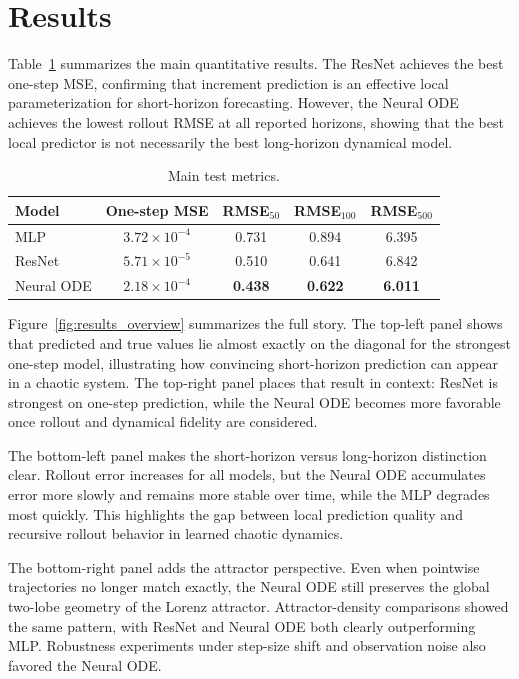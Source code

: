 \documentclass[conference]{IEEEtran}
\begin{document}
\section{Results}
Table~\ref{tab:results} summarizes the main quantitative results. The ResNet achieves the best one-step MSE, confirming that increment prediction is an effective local parameterization for short-horizon forecasting. However, the Neural ODE achieves the lowest rollout RMSE at all reported horizons, showing that the best local predictor is not necessarily the best long-horizon dynamical model.

\begin{table}[t]
\caption{Main test metrics.}
\label{tab:results}
\centering
\footnotesize
\begin{tabular}{lcccc}
\toprule
Model & One-step MSE & RMSE$_{50}$ & RMSE$_{100}$ & RMSE$_{500}$ \\
\midrule
MLP & $3.72{\times}10^{-4}$ & 0.731 & 0.894 & 6.395 \\
ResNet & \textbf{$5.71{\times}10^{-5}$} & 0.510 & 0.641 & 6.842 \\
Neural ODE & $2.18{\times}10^{-4}$ & \textbf{0.438} & \textbf{0.622} & \textbf{6.011} \\
\bottomrule
\end{tabular}
\end{table}

Figure~\ref{fig:results_overview} summarizes the full story. The top-left panel shows that predicted and true values lie almost exactly on the diagonal for the strongest one-step model, illustrating how convincing short-horizon prediction can appear in a chaotic system. The top-right panel places that result in context: ResNet is strongest on one-step prediction, while the Neural ODE becomes more favorable once rollout and dynamical fidelity are considered.

The bottom-left panel makes the short-horizon versus long-horizon distinction clear. Rollout error increases for all models, but the Neural ODE accumulates error more slowly and remains more stable over time, while the MLP degrades most quickly. This highlights the gap between local prediction quality and recursive rollout behavior in learned chaotic dynamics.

The bottom-right panel adds the attractor perspective. Even when pointwise trajectories no longer match exactly, the Neural ODE still preserves the global two-lobe geometry of the Lorenz attractor. Attractor-density comparisons showed the same pattern, with ResNet and Neural ODE both clearly outperforming MLP. Robustness experiments under step-size shift and observation noise also favored the Neural ODE.
\end{document}
